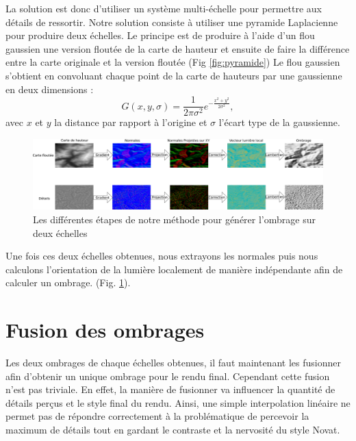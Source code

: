La solution est donc d'utiliser un système multi-échelle pour permettre aux détails de ressortir. Notre solution consiste à utiliser une pyramide Laplacienne \cite{adelson1984pyramid} pour produire deux échelles. Le principe est de produire à l'aide d'un flou gaussien une version floutée de la carte de hauteur et ensuite de faire la différence entre la carte originale et la version floutée (Fig \ref{fig:pyramide})
Le flou gaussien s'obtient en convoluant chaque point de la carte de hauteurs par une gaussienne en deux dimensions : 
\begin{equation}
G(x,y,\sigma) = \frac{1}{2\pi\sigma^2}e^{-\frac{x^2+y^2}{2\sigma^2}},
\end{equation}
avec $x$ et $y$ la distance par rapport à l'origine et $\sigma$ l’écart type de la gaussienne.


\begin{figure}
\centering
\includegraphics[width=1.0\linewidth]{Solution/pyramide_Laplace_image_extended.png}

\caption{\label{fig:pyramide_extended}Les différentes étapes de notre méthode pour générer l'ombrage sur deux échelles}
\end{figure}




Une fois ces deux échelles obtenues, nous extrayons les normales puis nous calculons l'orientation de la lumière localement de manière indépendante afin de calculer un ombrage. (Fig. \ref{fig:pyramide_extended}).  


\section{Fusion des ombrages}
Les deux ombrages de chaque échelles obtenues, il faut maintenant les fusionner afin d'obtenir un unique ombrage pour le rendu final. Cependant cette fusion n'est pas triviale. En effet, la manière de fusionner va influencer la quantité de détails perçus et le style final du rendu. Ainsi, une simple interpolation linéaire ne permet pas de répondre correctement à la problématique de percevoir la maximum de détails tout en gardant le contraste et la nervosité du style Novat. 

